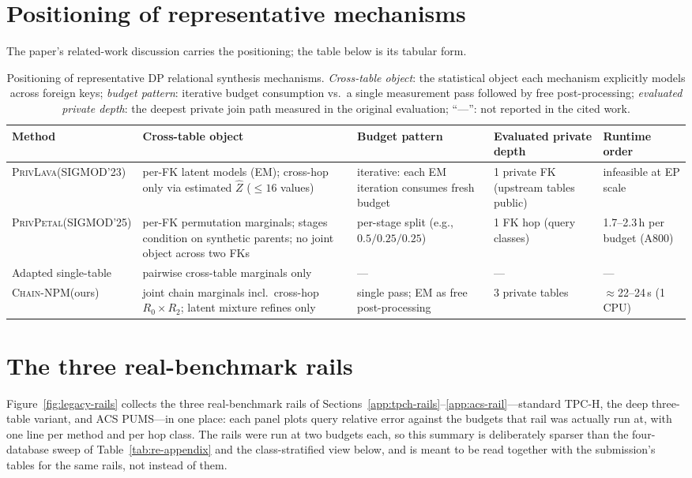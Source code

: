 \documentclass[sigconf, nonacm]{acmart}
\newcommand{\chainnpm}{\textsc{Chain-NPM}\xspace}
\newcommand{\privlava}{\textsc{PrivLava}\xspace}
\newcommand{\privpetal}{\textsc{PrivPetal}\xspace}
\begin{document}
\section{Positioning of representative mechanisms}
\label{app:position}

The paper's related-work discussion carries the positioning; the table
below is its tabular form.

\begin{table}[t]
\centering
\caption{Positioning of representative DP relational synthesis
mechanisms. \emph{Cross-table object}: the statistical object each
mechanism explicitly models across foreign keys; \emph{budget pattern}:
iterative budget consumption vs.\ a single measurement pass followed by
free post-processing; \emph{evaluated private depth}: the deepest
private join path measured in the original evaluation; ``---'': not
reported in the cited work.}
\label{tab:position}
\small
\begin{tabular}{@{}p{2.1cm}p{4.7cm}p{3.3cm}p{2.7cm}p{2.7cm}@{}}
\toprule
Method & Cross-table object & Budget pattern & Evaluated private depth & Runtime order \\
\midrule
\privlava (SIGMOD'23) & per-FK latent models (EM); cross-hop only via
estimated $\hat Z$ ($\le 16$ values) & iterative: each EM iteration
consumes fresh budget & 1 private FK (upstream tables public) &
infeasible at EP scale \\
\privpetal (SIGMOD'25) & per-FK permutation marginals; stages condition
on synthetic parents; no joint object across two FKs & per-stage split
(e.g., $0.5/0.25/0.25$) & 1 FK hop (query classes) & 1.7--2.3\,h per
budget (A800) \\
Adapted single-table \cite{alimohammadi2024adapting} & pairwise
cross-table marginals only & --- & --- & --- \\
\chainnpm (ours) & joint chain marginals incl.\ cross-hop
$R_0{\times}R_2$; latent mixture refines only & single pass; EM as free
post-processing & 3 private tables & $\approx$22--24\,s (1 CPU) \\
\bottomrule
\end{tabular}
\end{table}

\section{The three real-benchmark rails}
\label{app:rails}

Figure~\ref{fig:legacy-rails} collects the three real-benchmark rails of
Sections~\ref{app:tpch-rails}--\ref{app:acs-rail}---standard TPC-H, the deep
three-table variant, and ACS PUMS---in one place: each panel plots query
relative error against the budgets that rail was actually run at, with one
line per method and per hop class. The rails were run at two budgets each, so
this summary is deliberately sparser than the four-database sweep of
Table~\ref{tab:re-appendix} and the class-stratified view below, and is meant to
be read
together with the submission's tables for the same rails, not instead of
them.
\end{document}
